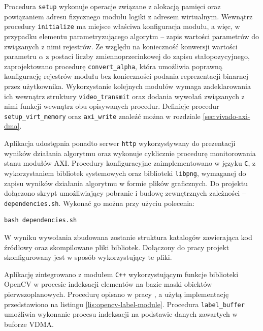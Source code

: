 Procedura \texttt{setup} wykonuje operacje związane z alokacją pamięci oraz powiązaniem adresu fizycznego modułu logiki z adresem wirtualnym.
Wewnątrz procedury \texttt{initialize} ma miejsce właściwa konfiguracja modułu, a więc, w przypadku elementu parametryzującego algorytm -- zapis wartości parametrów do związanych z nimi rejestrów. 
Ze względu na konieczność konwersji wartości parametru $\alpha$ z postaci liczby zmiennoprzecinkowej do zapisu stałopozycyjnego, zaprojektowano procedurę \texttt{convert\_alpha}, która umożliwia poprawną konfigurację rejestrów modułu bez konieczności podania reprezentacji binarnej przez użytkownika. 
Wykorzystanie kolejnych modułów wymaga zadeklarowania ich wewnątrz struktury \texttt{video\_transmit} oraz dodania wywołań związanych z nimi funkcji wewnątrz obu opisywanych procedur.
Definicje procedur \texttt{setup\_virt\_memory} oraz \texttt{axi\_write} znaleźć można w rozdziale \ref{sec:vivado-axi-dma}.

Aplikacja udostępnia ponadto serwer \texttt{http} wykorzystywany do prezentacji wyników działania algorytmu oraz wykonuje cyklicznie procedurę monitorowania stanu modułów AXI.
Procedury konfiguracyjne zaimplementowano w języku \texttt{C}, z wykorzystaniem bibliotek systemowych oraz biblioteki \texttt{libpng}, wymaganej do zapisu wyników działania algorytmu w formie plików graficznych.
Do projektu dołączono skrypt umożliwiający pobranie i budowę zewnętrznych zależności -- \texttt{dependencies.sh}. 
Wykonać go można przy użyciu polecenia:

\begin{lstlisting}
bash dependencies.sh
\end{lstlisting}
W wyniku wywołania zbudowana zostanie struktura katalogów zawierająca kod źródłowy oraz skompilowane pliki bibliotek. 
Dołączony do pracy projekt skonfigurowany jest w sposób wykorzystujący te pliki.

Aplikację zintegrowano z modułem \texttt{C++} wykorzystującym funkcje biblioteki OpenCV w procesie indeksacji elementów na bazie maski obiektów pierwszoplanowych. 
Procedurę opisano w pracy \cite{Bradski2016}, a użytą implementację przedstawiono na listingu \ref{lis:opencv-label-module}.
Procedura \texttt{label\_buffer} umożliwia wykonanie procesu indeksacji na podstawie danych zawartych w buforze VDMA.

